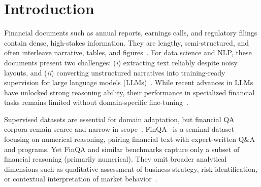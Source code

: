 \documentclass[sigconf,authordraft,anonymous]{acmart}
\begin{document}


\maketitle

\renewcommand\footnotetextcopyrightpermission[1]{}

\section{Introduction}
Financial documents such as annual reports, earnings calls, and regulatory filings contain dense, high-stakes information. They are lengthy, semi-structured, and often interleave narrative, tables, and figures~\cite{Meirkulov2024,FINRA2023}. For data science and NLP, these documents present two challenges: (\emph{i}) extracting text reliably despite noisy layouts, and (\emph{ii}) converting unstructured narratives into training-ready supervision for large language models (LLMs)~\cite{Feng2021}. While recent advances in LLMs have unlocked strong reasoning ability, their performance in specialized financial tasks remains limited without domain-specific fine-tuning~\cite{Jeong2024}.

Supervised datasets are essential for domain adaptation, but financial QA corpora remain scarce and narrow in scope~\cite{Chen2023FinTextQA}. FinQA~\cite{chen2022finqadatasetnumericalreasoning} is a seminal dataset focusing on numerical reasoning, pairing financial text with expert-written Q\&A and programs. Yet FinQA and similar benchmarks capture only a subset of financial reasoning (primarily numerical). They omit broader analytical dimensions such as qualitative assessment of business strategy, risk identification, or contextual interpretation of market behavior~\cite{Mateega2025}.
\end{document}
